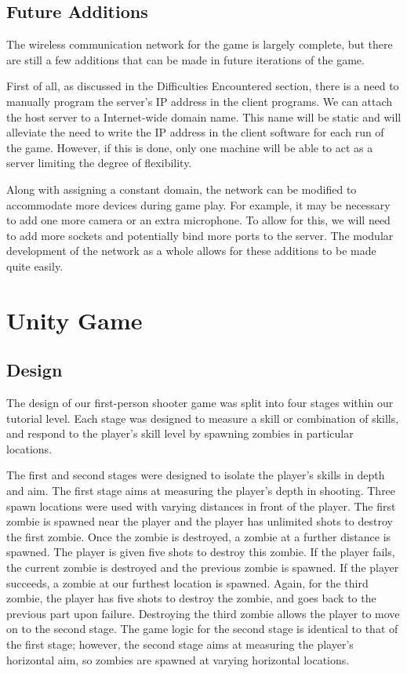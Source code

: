 \documentclass[titlepage, 12pt]{scrartcl}
\begin{document}
    \subsection{Future Additions}
        The wireless communication network for the game is largely complete, but there are still a few additions that can be made in future iterations of the game. \par
        First of all, as discussed in the Difficulties Encountered section, there is a need to manually program the server's IP address in the client programs. We can attach the host server to a Internet-wide domain name. This name will be static and will alleviate the need to write the IP address in the client software for each run of the game. However, if this is done, only one machine will be able to act as a server limiting the degree of flexibility. \par
        Along with assigning a constant domain, the network can be modified to accommodate more devices during game play. For example, it may be necessary to add one more camera or an extra microphone. To allow for this, we will need to add more sockets and potentially bind more ports to the server. The modular development of the network as a whole allows for these additions to be made quite easily.
\section{Unity Game}
    \subsection{Design}
    The design of our first-person shooter game was split into four stages within our tutorial level. Each stage was designed to measure a skill or combination of skills, and respond to the player's skill level by spawning zombies in particular locations.
    
    \par The first and second stages were designed to isolate the player's skills in depth and aim. The first stage aims at measuring the player's depth in shooting. Three spawn locations were used with varying distances in front of the player. The first zombie is spawned near the player and the player has unlimited shots to destroy the first zombie. Once the zombie is destroyed, a zombie at a further distance is spawned. The player is given five shots to destroy this zombie. If the player fails, the current zombie is destroyed and the previous zombie is spawned. If the player succeeds, a zombie at our furthest location is spawned. Again, for the third zombie, the player has five shots to destroy the zombie, and goes back to the previous part upon failure. Destroying the third zombie allows the player to move on to the second stage. The game logic for the second stage is identical to that of the first stage; however, the second stage aims at measuring the player's horizontal aim, so zombies are spawned at varying horizontal locations.
    
\end{document}
